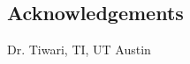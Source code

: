 \documentclass[a0,landscape]{a0poster}
\begin{document}
\begin{multicols}{3}

\section*{Acknowledgements}
Dr. Tiwari, TI, UT Austin


\end{multicols}
\end{document}
